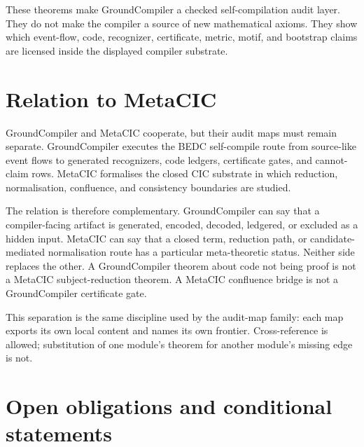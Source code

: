 These theorems make GroundCompiler a checked self-compilation audit layer. They
do not make the compiler a source of new mathematical axioms. They show which
event-flow, code, recognizer, certificate, metric, motif, and bootstrap claims
are licensed inside the displayed compiler substrate.


\section{Relation to MetaCIC}
\label{sec:bedc-groundcompiler-audit-map-relation-to-metacic}

GroundCompiler and MetaCIC cooperate, but their audit maps must remain
separate. GroundCompiler executes the BEDC self-compile route from source-like
event flows to generated recognizers, code ledgers, certificate gates, and
cannot-claim rows. MetaCIC formalises the closed CIC substrate in which
reduction, normalisation, confluence, and consistency boundaries are studied.

The relation is therefore complementary. GroundCompiler can say that a
compiler-facing artifact is generated, encoded, decoded, ledgered, or excluded
as a hidden input. MetaCIC can say that a closed term, reduction path, or
candidate-mediated normalisation route has a particular meta-theoretic status.
Neither side replaces the other. A GroundCompiler theorem about code not being
proof is not a MetaCIC subject-reduction theorem. A MetaCIC confluence bridge
is not a GroundCompiler certificate gate.

This separation is the same discipline used by the audit-map family: each map
exports its own local content and names its own frontier. Cross-reference is
allowed; substitution of one module's theorem for another module's missing
edge is not.

\section{Open obligations and conditional statements}
\label{sec:bedc-groundcompiler-audit-map-open-obligations}


